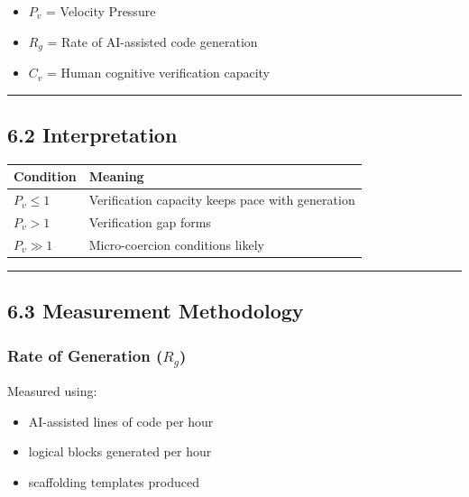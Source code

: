 \documentclass[
]{article}
\newcounter{none} %
\providecommand{\tightlist}{%
  \setlength{\itemsep}{0pt}\setlength{\parskip}{0pt}}
\begin{document}
\begin{itemize}
\tightlist
\item
  \(P_v\) = Velocity Pressure
\item
  \(R_g\) = Rate of AI-assisted code generation
\item
  \(C_v\) = Human cognitive verification capacity
\end{itemize}

\begin{center}\rule{0.5\linewidth}{0.5pt}\end{center}

\subsection{6.2 Interpretation}\label{62-interpretation}

{\def\LTcaptype{none} %
\begin{longtable}[]{@{}ll@{}}
\toprule\noalign{}
Condition & Meaning \\
\midrule\noalign{}
\endhead
\bottomrule\noalign{}
\endlastfoot
\(P_v \le 1\) & Verification capacity keeps pace with generation \\
\(P_v > 1\) & Verification gap forms \\
\(P_v \gg 1\) & Micro-coercion conditions likely \\
\end{longtable}
}

\begin{center}\rule{0.5\linewidth}{0.5pt}\end{center}

\subsection{6.3 Measurement
Methodology}\label{63-measurement-methodology}

\subsubsection{\texorpdfstring{Rate of Generation
(\(R_g\))}{Rate of Generation (R\_g)}}\label{rate-of-generation-r_g}

Measured using:

\begin{itemize}
\tightlist
\item
  AI-assisted lines of code per hour
\item
  logical blocks generated per hour
\item
  scaffolding templates produced
\end{itemize}
\end{document}
